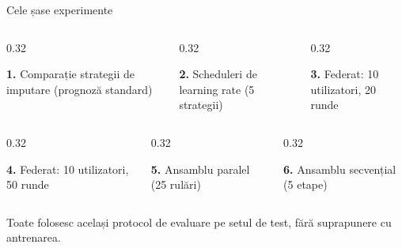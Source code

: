 \documentclass[aspectratio=169, 11pt]{beamer}
\begin{document}
\begin{frame}{Cele șase experimente}
  \begin{columns}[t]
    \begin{column}{0.32\textwidth}
      \begin{card}\small\textbf{\color{accent}1.} Comparație strategii de imputare (prognoză standard)\end{card}
    \end{column}
    \begin{column}{0.32\textwidth}
      \begin{card}\small\textbf{\color{accent}2.} Scheduleri de learning rate (5 strategii)\end{card}
    \end{column}
    \begin{column}{0.32\textwidth}
      \begin{card}\small\textbf{\color{accent}3.} Federat: 10 utilizatori, 20 runde\end{card}
    \end{column}
  \end{columns}
  \vspace{0.5em}
  \begin{columns}[t]
    \begin{column}{0.32\textwidth}
      \begin{card}\small\textbf{\color{accent}4.} Federat: 10 utilizatori, 50 runde\end{card}
    \end{column}
    \begin{column}{0.32\textwidth}
      \begin{card}\small\textbf{\color{accent}5.} Ansamblu paralel (25 rulări)\end{card}
    \end{column}
    \begin{column}{0.32\textwidth}
      \begin{card}\small\textbf{\color{accent}6.} Ansamblu secvențial (5 etape)\end{card}
    \end{column}
  \end{columns}
  \vfill
  \centering\footnotesize\color{primary} Toate folosesc același protocol de evaluare pe setul de test, fără suprapunere cu antrenarea.
\end{frame}
\end{document}
